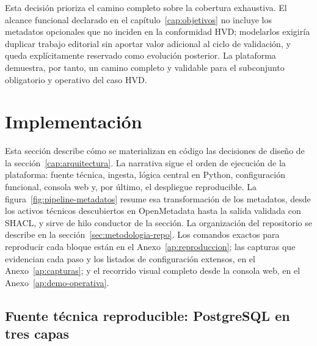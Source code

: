 
Esta decisión prioriza el camino completo sobre la cobertura exhaustiva. El alcance funcional declarado en el capítulo~\ref{cap:objetivos} no incluye los metadatos opcionales que no inciden en la conformidad \ac{HVD}; modelarlos exigiría duplicar trabajo editorial sin aportar valor adicional al ciclo de validación, y queda explícitamente reservado como evolución posterior. La plataforma demuestra, por tanto, un camino completo y validable para el subconjunto obligatorio y operativo del caso \ac{HVD}.

\section{Implementación}\label{cap:implementacion}

Esta sección describe cómo se materializan en código las decisiones de diseño de la sección~\ref{cap:arquitectura}. La narrativa sigue el orden de ejecución de la plataforma: fuente técnica, ingesta, lógica central en Python, configuración funcional, consola web y, por último, el despliegue reproducible. La figura~\ref{fig:pipeline-metadatos} resume esa transformación de los metadatos, desde los activos técnicos descubiertos en OpenMetadata hasta la salida validada con SHACL, y sirve de hilo conductor de la sección. La organización del repositorio se describe en la sección~\ref{sec:metodologia-repo}. Los comandos exactos para reproducir cada bloque están en el Anexo~\ref{ap:reproduccion}; las capturas que evidencian cada paso y los listados de configuración extensos, en el Anexo~\ref{ap:capturas}; y el recorrido visual completo desde la consola web, en el Anexo~\ref{ap:demo-operativa}.


\subsection{Fuente técnica reproducible: PostgreSQL en tres capas}\label{sec:implementacion-postgres}

